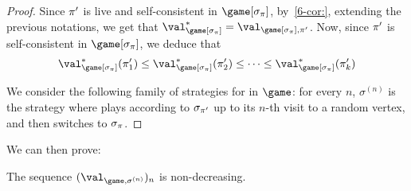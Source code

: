 \begin{proof}
  Since $\pi'$ is live and self-consistent in $\game[\sigma_\perm]$,
  by~\cref{6-cor:}, extending the previous notations, we
  get that
  $\val^*_{\game[\sigma_\perm]} =
  \val_{\game[\sigma_\perm],\perm'}$. Now, since $\pi'$ is
  self-consistent in $\game[\sigma_\perm]$, we deduce that
  \[
    \val^*_{\game[\sigma_\perm]}(\perm'_1) \le
    \val^*_{\game[\sigma_\perm]}(\perm'_2) \le \dots \le
    \val^*_{\game[\sigma_\perm]}(\perm'_k)
  \]

  We consider the following family of strategies for \Eve in $\game$:
  for every $n$, $\sigma^{(n)}$ is the strategy where \Eve plays
  according to $\sigma_{\pi'}$ up to its $n$-th visit to a random
  vertex, and then switches to $\sigma_\pi$. 
\end{proof} 
We can then prove:
\begin{lemma}
\label{6-lem:convergence_sequence_values}
The sequence $(\val_{\game,\sigma^{(n)}})_n$ is non-decreasing.
\end{lemma}

